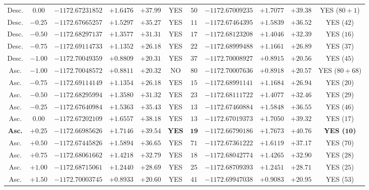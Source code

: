 \documentclass[10pt,twocolumn,a4paper]{article}
\begin{document}
\begin{table}[t]
{\begin{tabular}{@{}cc|ccccc|cccc@{}}
Desc. & $0.00$ & $-1172.67231852$ & $+1.6476$ & $+37.99$ & YES & $50$ & $-1172.67009235$ & $+1.7077$ & $+39.38$ & YES ($80+1$) \\
Desc. & $-0.25$ & $-1172.67665257$ & $+1.5297$ & $+35.27$ & YES & $11$ & $-1172.67464395$ & $+1.5839$ & $+36.52$ & YES ($42$) \\
Desc. & $-0.50$ & $-1172.68297137$ & $+1.3577$ & $+31.31$ & YES & $17$ & $-1172.68123208$ & $+1.4046$ & $+32.39$ & YES ($16$) \\
Desc. & $-0.75$ & $-1172.69114733$ & $+1.1352$ & $+26.18$ & YES & $22$ & $-1172.68999488$ & $+1.1661$ & $+26.89$ & YES ($37$) \\
Desc. & $-1.00$ & $-1172.70049359$ & $+0.8809$ & $+20.31$ & YES & $37$ & $-1172.70008927$ & $+0.8915$ & $+20.56$ & YES ($45$) \\ \midrule
Asc. & $-1.00$ & $-1172.70048572$ & $+0.8811$ & $+20.32$ & NO & $80$ & $-1172.70007636$ & $+0.8918$ & $+20.57$ & YES ($80+68$) \\
Asc. & $-0.75$ & $-1172.69114149$ & $+1.1354$ & $+26.18$ & YES & $15$ & $-1172.68991141$ & $+1.1684$ & $+26.94$ & YES ($20$) \\
Asc. & $-0.50$ & $-1172.68295994$ & $+1.3580$ & $+31.32$ & YES & $23$ & $-1172.68111722$ & $+1.4077$ & $+32.46$ & YES ($29$) \\
Asc. & $-0.25$ & $-1172.67640984$ & $+1.5363$ & $+35.43$ & YES & $13$ & $-1172.67460884$ & $+1.5848$ & $+36.55$ & YES ($46$) \\
Asc. & $0.00$ & $-1172.67202109$ & $+1.6557$ & $+38.18$ & YES & $13$ & $-1172.67019373$ & $+1.7050$ & $+39.32$ & YES ($17$) \\
\textbf{Asc.} & $\mathbf{+0.25}$ & $\mathbf{-1172.66985626}$ & $\mathbf{+1.7146}$ & $\mathbf{+39.54}$ & \textbf{YES} & $\mathbf{19}$ & $\mathbf{-1172.66790186}$ & $\mathbf{+1.7673}$ & $\mathbf{+40.76}$ & \textbf{YES ($\mathbf{10}$)} \\
Asc. & $+0.50$ & $-1172.67445826$ & $+1.5894$ & $+36.65$ & YES & $71$ & $-1172.67361222$ & $+1.6119$ & $+37.17$ & YES ($70$) \\
Asc. & $+0.75$ & $-1172.68061662$ & $+1.4218$ & $+32.79$ & YES & $18$ & $-1172.68042774$ & $+1.4265$ & $+32.90$ & YES ($28$) \\
Asc. & $+1.00$ & $-1172.68715061$ & $+1.2440$ & $+28.69$ & YES & $25$ & $-1172.68709393$ & $+1.2451$ & $+28.71$ & YES ($25$) \\
Asc. & $+1.50$ & $-1172.70003745$ & $+0.8933$ & $+20.60$ & YES & $41$ & $-1172.69947038$ & $+0.9083$ & $+20.95$ & YES ($53$) \\ \bottomrule
\end{tabular}%
}
\end{table}
\end{document}
